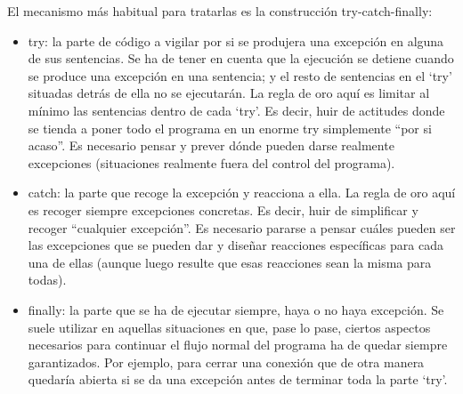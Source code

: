 \documentclass[spanish,12pt,a4paper,final,oneside]{book}
\begin{document}
El mecanismo más habitual para tratarlas es la construcción try-catch-finally:
\begin{itemize}
\item try: la parte de código a vigilar por si se produjera una excepción en alguna de sus sentencias.
Se ha de tener en cuenta que la ejecución se detiene cuando se produce una excepción en una sentencia; y el resto de sentencias en el ‘try’ situadas detrás de ella no se ejecutarán.
La regla de oro aquí es limitar al mínimo las sentencias dentro de cada ‘try’. Es decir, huir de actitudes donde se tienda a poner todo el programa en un enorme try simplemente “por si acaso”. Es necesario pensar y prever dónde pueden darse realmente excepciones (situaciones realmente fuera del control del programa).
\item catch: la parte que recoge la excepción y reacciona a ella.
La regla de oro aquí es recoger siempre excepciones concretas. Es decir, huir de simplificar y recoger “cualquier excepción”. Es necesario pararse a pensar cuáles pueden ser las excepciones que se pueden dar y diseñar reacciones específicas para cada una de ellas (aunque luego resulte que esas reacciones sean la misma para todas).
\item finally: la parte que se ha de ejecutar siempre, haya o no haya excepción.
Se suele utilizar en aquellas situaciones en que, pase lo pase, ciertos aspectos necesarios para continuar el flujo normal del programa ha de quedar siempre garantizados. Por ejemplo, para cerrar una conexión que de otra manera quedaría abierta si se da una excepción antes de terminar toda la parte ‘try’.
\end{itemize}


\vspace{1cm}
\end{document}
